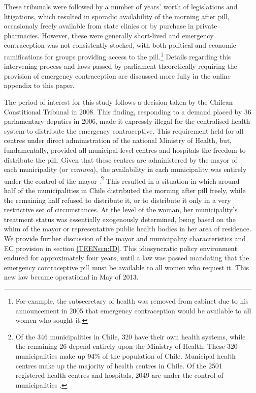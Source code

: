 These tribunals were followed by a number of years' worth of legislations and
litigations, which resulted in sporadic availability of the morning
after pill, occasionaly freely available from state clinics or by purchase in
private pharmacies.  However, these were generally short-lived and emergency
contraception was not consistently stocked, with both political and economic 
ramifications for groups providing access to the pill.\footnote{For example,
the subsecretary of health was removed from cabinet due to his announcement
in 2005 that emergency contraception would be available to all women who sought
it.}  Details regarding this intervening process and laws passed by parliament
theoretically requiring the provision of emergency contraception are discussed 
more fully in the online appendix to this paper.

The period of interest for this study follows a decision taken by the Chilean
Constitional Tribunal in 2008.  This finding, responding to a demand placed by
36 parlamentary deputies in 2006, made it expressly illegal for the centralised
health system to distribute the emergency contraceptive.  This requirement held
for all centres under direct administration of the national Ministry of Health,
but, fundamentally, provided all municipal-level centres and hospitals the 
freedom to distribute the pill.  Given that these centres are administered by 
the mayor of each municipality (or \emph{comuna}), the availability in each 
municipality was entirely under the control of the mayor \citep{Didesetal2011,
Didesetal2010,Didesetal2009}.\footnote{Of the 346 municipalities in Chile, 320
have their own health systems, while the remaining 26 depend entirely upon the
Ministry of Health.  These 320 municipalities make up 94\% of the population 
of Chile.  Municipal health centres make up the majority of health centres in 
Chile.  Of the 2501 registered health centres and hospitals, 2049 are under the
control of municipalities \citep{DEIS2013}.}  This resulted in a situation in
which around half of the municipalities in Chile distributed the morning after
pill freely, while the remaining half refused to distribute it, or to 
distribute it only in a very restrictive set of circumstances.  At the level
of the woman, her municipality's treatment status was essentially exogenously
determined, being based on the whim of the mayor or representative public 
health bodies in her area of residence.  We provide further discussion of the
mayor and municipality characteristics and EC provision in section 
\ref{TEENscn:ID}.  This idiosyncratic policy environment endured for 
approximately four years, until a law was passed mandating that the emergency 
contraceptive pill must be available to all women who request it.  This new 
law became operational in May of 2013.

